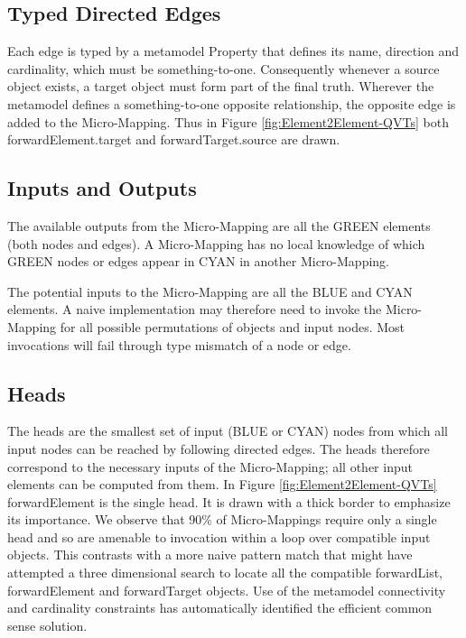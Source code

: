 \documentclass[conference]{IEEEtran}
\begin{document}
\subsection{Typed Directed Edges}

Each edge is typed by a metamodel Property that defines its name, direction and cardinality, which must be something-to-one. Consequently whenever a source object exists, a target object must form part of the final truth.
Wherever the metamodel defines a something-to-one opposite relationship, the opposite edge is added to the Micro-Mapping. Thus in Figure \ref{fig:Element2Element-QVTs} both forwardElement.target and forwardTarget.source are drawn.%

\subsection{Inputs and Outputs}

The available outputs from the Micro-Mapping are all the GREEN elements (both nodes and edges). A Micro-Mapping has no local knowledge of which GREEN nodes or edges appear in CYAN in another Micro-Mapping.

The potential inputs to the Micro-Mapping are all the BLUE and CYAN elements. A naive implementation may therefore need to invoke the Micro-Mapping for all possible permutations of objects and input nodes. Most invocations will fail through type mismatch of a node or edge. 

\subsection{Heads}
   
The heads are the smallest set of input (BLUE or CYAN) nodes from which all input nodes can be reached by following directed edges. %
The heads therefore correspond to the necessary inputs of the Micro-Mapping; all other input elements can be computed from them. In Figure \ref{fig:Element2Element-QVTs} forwardElement is the single head. It is drawn with a thick border to emphasize its importance. We observe that 90\% of Micro-Mappings require only a single head and so are amenable to invocation within a loop over compatible input objects. This contrasts with a more naive pattern match that might have attempted a three dimensional search to locate all the compatible forwardList, forwardElement and forwardTarget objects. Use of the metamodel connectivity and cardinality constraints has automatically identified the efficient common sense solution.
\end{document}
